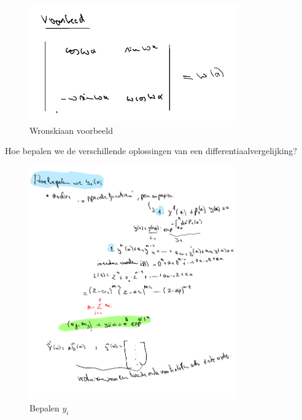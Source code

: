 \documentclass[a4paper]{report}
\begin{document}
\begin{figure}[H]
	\centering
	\includegraphics[width=0.8\textwidth]{assets/wronskiaan_voorbeeld.png}
	\caption{Wronskiaan voorbeeld}
	\label{fig:wronskiaan_voorbeeld}
\end{figure}

Hoe bepalen we de verschillende oplossingen van een differentiaalvergelijking?

\begin{figure}[H]
	\centering
	\includegraphics[width=0.8\textwidth]{assets/bepalen_y_i.png}
	\caption{Bepalen $y_i$}
	\label{fig:bepalen_y_i}
\end{figure}
\end{document}
